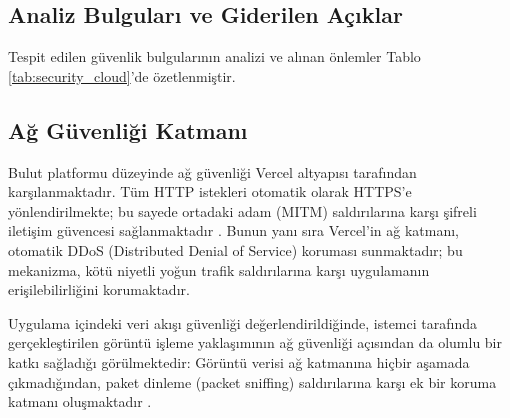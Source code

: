 \subsection{Analiz Bulguları ve Giderilen Açıklar}

Tespit edilen güvenlik bulgularının analizi ve alınan önlemler Tablo \ref{tab:security_cloud}'de özetlenmiştir.

\begin{table}[!ht]
    \centering
    \caption{Bulut Ortamı Güvenlik Analizi -- Bulgular ve Çözümler}
    \label{tab:security_cloud}
\end{table}

\subsection{Ağ Güvenliği Katmanı}

Bulut platformu düzeyinde ağ güvenliği Vercel altyapısı tarafından karşılanmaktadır. Tüm HTTP istekleri otomatik olarak HTTPS'e yönlendirilmekte; bu sayede ortadaki adam (MITM) saldırılarına karşı şifreli iletişim güvencesi sağlanmaktadır \cite{letsencrypt2023}. Bunun yanı sıra Vercel'in ağ katmanı, otomatik DDoS (Distributed Denial of Service) koruması sunmaktadır; bu mekanizma, kötü niyetli yoğun trafik saldırılarına karşı uygulamanın erişilebilirliğini korumaktadır.

Uygulama içindeki veri akışı güvenliği değerlendirildiğinde, istemci tarafında gerçekleştirilen görüntü işleme yaklaşımının ağ güvenliği açısından da olumlu bir katkı sağladığı görülmektedir: Görüntü verisi ağ katmanına hiçbir aşamada çıkmadığından, paket dinleme (packet sniffing) saldırılarına karşı ek bir koruma katmanı oluşmaktadır \cite{owasp2023mobile}.
